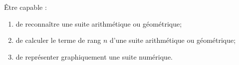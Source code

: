 \begin{myobj}
	Être capable : 
\begin{enumerate}
	\item de reconnaître une suite arithmétique ou géométrique;
	\item de calculer le terme de rang $n$ d'une suite arithmétique ou géométrique;
	\item de représenter graphiquement une suite numérique.
\end{enumerate}
\end{myobj}
